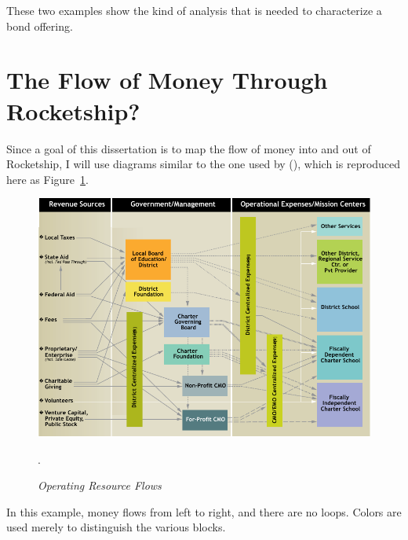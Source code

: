 These two examples show the kind of analysis that is needed to characterize a bond offering.


\section{The Flow of Money Through Rocketship?}\label{sec:flows-of-money}\indent

Since a goal of this dissertation is to map the flow of money into and out of Rocketship, I will use diagrams similar to the one used by \citeauthor{Baker.Miron2015} (\citeyear{Baker.Miron2015}), which is reproduced here as Figure~\ref{fig:opresflows}.
\begin{figure}[ht]
  \centering
  \caption[Operating Resource Flows]{\textit{Operating Resource Flows}}\label{fig:opresflows}
  \includegraphics[width=\textwidth]{Operating_Resource_Flows}\\
  \footnotesize\raggedright\textcite[16]{Baker.Miron2015}.
\end{figure}
In this example, money flows from left to right, and there are no loops. Colors are used merely to distinguish the various blocks.

